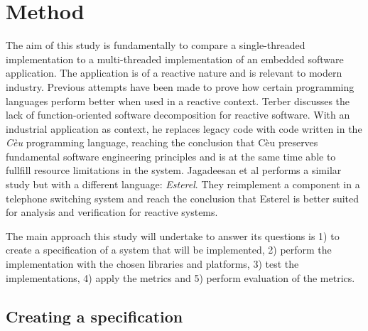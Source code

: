 \chapter{Method}
\label{cha:method}

\iffalse
In this chapter, the method is described in a way which shows how the
work was actually carried out. The description must be precise and
well thought through. Consider the scientific term
replicability. Replicability means that someone reading a scientific
report should be able to follow the method description and then carry
out the same study and check whether the results obtained are
similar. Achieving replicability is not always relevant, but precision
and clarity is.

Sometimes the work is separated into different parts, e.g.  pre-study,
implementation and evaluation. In such cases it is recommended that
the method chapter is structured accordingly with suitable named
sub-headings.
\fi

The aim of this study is fundamentally to compare a single-threaded
implementation to a multi-threaded implementation of an embedded software
application. The application is of a reactive nature and is relevant to modern
industry. Previous attempts have been made to prove how certain programming
languages perform better when used in a reactive context. Terber
\cite{terber2017function} discusses the lack of function-oriented software
decomposition for reactive software. With an industrial application as context,
he replaces legacy code with code written in the \textit{Cèu} programming
language, reaching the conclusion that Cèu preserves fundamental software
engineering principles and is at the same time able to fullfill resource
limitations in the system. Jagadeesan et al \cite{jagadeesan1996formal}
performs a similar study but with a different language: \textit{Esterel}. They
reimplement a component in a telephone switching system and reach the
conclusion that Esterel is better suited for analysis and verification for
reactive systems.

The main approach this study will undertake to answer its questions is 1) to
create a specification of a system that will be implemented, 2) perform the
implementation with the chosen libraries and platforms, 3) test the
implementations, 4) apply the metrics and 5) perform evaluation of the metrics.

\section{Creating a specification}

